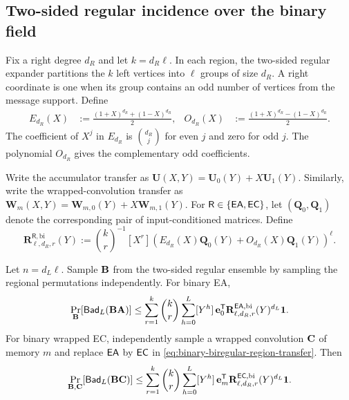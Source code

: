 \subsection{Two-sided regular incidence over the binary field}
\label{sec:binary-two-sided-regular}

Fix a right degree $d_R$ and let $k=d_R\ell$.  In each region, the
two-sided regular expander partitions the $k$ left vertices into $\ell$
groups of size $d_R$.  A right coordinate is one when its group contains an
odd number of vertices from the message support.  Define
\begin{align}
 E_{d_R}(X)&:=\frac{(1+X)^{d_R}+(1-X)^{d_R}}2,
 &
 O_{d_R}(X)&:=\frac{(1+X)^{d_R}-(1-X)^{d_R}}2.
 \label{eq:binary-biregular-parity-polynomials}
\end{align}
The coefficient of $X^j$ in $E_{d_R}$ is $\binom{d_R}{j}$ for even $j$
and zero for odd $j$.  The polynomial $O_{d_R}$ gives the complementary
odd coefficients.

Write the accumulator transfer as
$\mathbf U(X,Y)=\mathbf U_0(Y)+X\mathbf U_1(Y)$.  Similarly, write the
wrapped-convolution transfer as
$\mathbf W_m(X,Y)=\mathbf W_{m,0}(Y)+X\mathbf W_{m,1}(Y)$.  For
$\mathsf R\in\{\mathsf{EA},\mathsf{EC}\}$, let $(\mathbf Q_0,\mathbf Q_1)$ denote the
corresponding pair of input-conditioned matrices.  Define
\begin{equation}
 \mathbf R^{\mathsf R,\mathrm{bi}}_{\ell,d_R,r}(Y):=
 \binom{k}{r}^{-1}[X^r]
 \left(E_{d_R}(X)\mathbf Q_0(Y)
       +O_{d_R}(X)\mathbf Q_1(Y)\right)^\ell.
 \label{eq:binary-biregular-region-transfer}
\end{equation}

\begin{theorem}
\label{thm:binary-biregular-first-moment}
Let $n=d_L\ell$.  Sample $\mathbf B$ from the two-sided regular ensemble by
sampling the regional permutations independently.  For binary EA,
\begin{equation}
 \Pr_{\mathbf B}[\mathsf{Bad}_L(\mathbf B\mathbf A)]\leq
 \sum_{r=1}^{k}\binom{k}{r}\sum_{h=0}^{L}[Y^h]\,
 \mathbf e_0^{\mathsf T}
 \mathbf R^{\mathsf{EA},\mathrm{bi}}_{\ell,d_R,r}(Y)^{d_L}\mathbf 1.
 \label{eq:binary-biregular-ea-first-moment}
\end{equation}
For binary wrapped EC, independently sample a wrapped convolution $\mathbf C$ of
memory $m$ and replace $\mathsf{EA}$ by
$\mathsf{EC}$ in \eqref{eq:binary-biregular-region-transfer}.  Then
\begin{equation}
 \Pr_{\mathbf B,\mathbf C}[\mathsf{Bad}_L(\mathbf B\mathbf C)]\leq
 \sum_{r=1}^{k}\binom{k}{r}\sum_{h=0}^{L}[Y^h]\,
 \mathbf e_m^{\mathsf T}
 \mathbf R^{\mathsf{EC},\mathrm{bi}}_{\ell,d_R,r}(Y)^{d_L}\mathbf 1.
 \label{eq:binary-biregular-ec-first-moment}
\end{equation}
\end{theorem}

